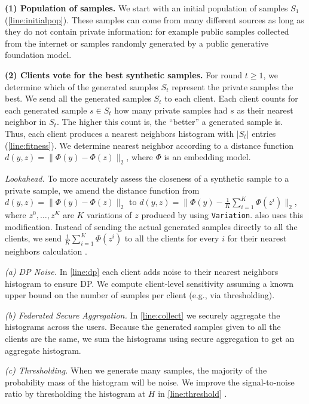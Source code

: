 \textbf{(1) Population of samples.} We start with an initial population of samples $S_1$ (\cref{line:initialpop}).  These samples can come from many different sources as long as they do not contain private information: for example public samples collected from the internet or samples randomly generated by a public generative foundation model.

\textbf{(2) Clients vote for the best synthetic samples.}  For round $t\geq 1$, we determine which of the generated samples $S_t$ represent the private samples the best.  We send all the generated samples $S_t$ to each client.  Each client counts for each generated sample $s\in S_t$ how many private samples had $s$ as their nearest neighbor in $S_t$.
The higher this count is, the ``better'' a generated sample is.  Thus, each client produces a nearest neighbors histogram with $|S_t|$ entries (\cref{line:fitness}). We determine nearest neighbor according to a distance function $d(y,z) = \|\Phi(y) - \Phi(z)\|_2$, where $\Phi$ is an embedding model.  


\textit{Lookahead.} To more accurately assess the closeness of a synthetic sample to a private sample, we amend the distance function from $d(y,z) = \|\Phi(y) - \Phi(z)\|_2$ to $d(y, z) = \|\Phi(y) - \frac{1}{K}\sum_{i=1}^K \Phi(z^i)\|_2$, where $z^0, \dots, z^K$ are $K$ variations of $z$ produced by using \texttt{Variation}. \citet{lin2023differentially} also uses this modification. Instead of sending the actual generated samples directly to all the clients, we send $\frac{1}{K}\sum_{i=1}^K \Phi(z^i)$ to all the clients for every $i$ for their nearest neighbors calculation .

\textit{(a) DP Noise.} In \cref{line:dp} each client adds noise to their nearest neighbors histogram to ensure DP. We compute client-level sensitivity assuming a known upper bound on the number of samples per client (e.g., via thresholding). 

\textit{(b) Federated Secure Aggregation.}  In \cref{line:collect}  we securely aggregate the histograms across the users.  Because the generated samples given to all the clients are the same, we sum the histograms using secure aggregation \citep{secagg} to get an aggregate histogram. 

\textit{(c) Thresholding.} When we generate many samples, the majority of the probability mass of the histogram will be noise.  We improve the signal-to-noise ratio by thresholding the histogram at $H$ in \cref{line:threshold} \citep{lin2023differentially}. 


